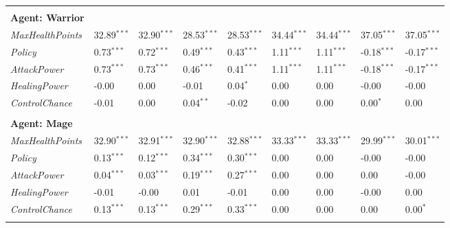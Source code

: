 \begin{tabular}{lllllllll}
&                           & & & & &                          & &\\
\textbf{Agent: Warrior }        &                           &                           & &\\
\textit{MaxHealthPoints} & 32.89${}^{***}$                   & 32.90${}^{***}$ & 28.53${}^{***}$ &  28.53${}^{***}$ & 34.44${}^{***}$  & 34.44${}^{***}$ & 37.05${}^{***}$  & 37.05${}^{***}$                \\
\textit{Policy}     & 0.73${}^{***}$                    & 0.72${}^{***}$      & 0.49${}^{***}$ &   0.43${}^{***}$ & 1.11${}^{***}$ & 1.11${}^{***}$ & -0.18${}^{***}$  & -0.17${}^{***}$         \\
\textit{AttackPower}     & 0.73${}^{***}$                    & 0.73${}^{***}$      & 0.46${}^{***}$ &   0.41${}^{***}$ & 1.11${}^{***}$ & 1.11${}^{***}$ & -0.18${}^{***}$  & -0.17${}^{***}$         \\
\textit{HealingPower}    & -0.00                   & 0.00     & -0.01  & 0.04${}^{*}$ & 0.00 & 0.00 & -0.00  & -0.00        \\
\textit{ControlChance}   & -0.01                   & 0.00    & 0.04${}^{**}$    & -0.02 & 0.00   & 0.00 & 0.00${}^{*}$  & 0.00        \\
&                           & & & & &                          & &\\
\textbf{Agent: Mage }        &                           &                           & &\\
\textit{MaxHealthPoints} & 32.90${}^{***}$                   & 32.91${}^{***}$ & 32.90${}^{***}$ &  32.88${}^{***}$ & 33.33${}^{***}$  & 33.33${}^{***}$ & 29.99${}^{***}$  & 30.01${}^{***}$                \\
\textit{Policy}     & 0.13${}^{***}$                    & 0.12${}^{***}$      & 0.34${}^{***}$ &   0.30${}^{***}$ & 0.00 & 0.00 & -0.00  & -0.00         \\
\textit{AttackPower}     & 0.04${}^{***}$                    & 0.03${}^{***}$      & 0.19${}^{***}$ &   0.27${}^{***}$ & 0.00 & 0.00 & 0.00  & -0.00         \\
\textit{HealingPower}    & -0.01                   & -0.00     & 0.01  & -0.01 & 0.00 & 0.00 & -0.00  & 0.00        \\
\textit{ControlChance}   & 0.13${}^{***}$                   & 0.13${}^{***}$    & 0.29${}^{***}$    & 0.33${}^{***}$ & 0.00   & 0.00 & 0.00  & 0.00${}^{*}$        \\
&                           & & & & &                          & &\\

\end{tabular}
